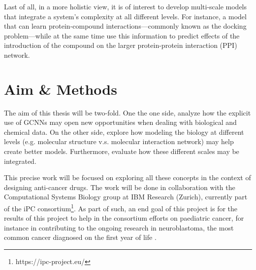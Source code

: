 \documentclass{article}
\begin{document}
Last of all, in a more holistic view, it is of interest to develop multi-scale models
that integrate a system's complexity at all different levels. For instance, a model that
can learn protein-compound interactions---commonly known as the docking problem---while
at the same time use this information to predict effects of the introduction of the
compound on the larger protein-protein interaction (PPI) network\cite{Sun2019}.

    \section*{Aim \& Methods}

The aim of this thesis will be two-fold. One the one side, analyze how the explicit
use of GCNNs may open new opportunities when dealing with biological and chemical
data. On the other side, explore how modeling the biology at different levels (e.g.
molecular structure v.s. molecular interaction network) may help create better
models. Furthermore, evaluate how these different scales may be integrated.

This precise work will be focused on exploring all these concepts in the context of
designing anti-cancer drugs. The work will be done in collaboration with the
Computational Systems Biology group at IBM Research (Zurich), currently part of the iPC
consortium\footnote{https://ipc-project.eu/}. As part of such, an end goal of this
project is for the results of this project to help in the consortium efforts on
paediatric cancer, for instance in contributing to the ongoing research in
neuroblastoma, the most common cancer diagnosed on the first year of life
\cite{Maris2010}.
\end{document}
